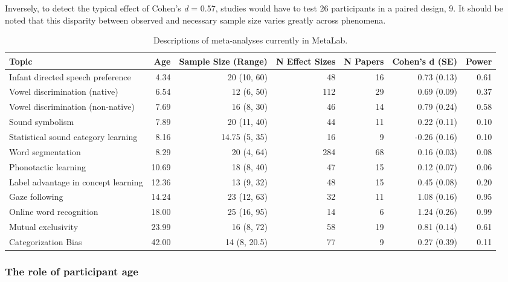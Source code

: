 \documentclass[english,floatsintext,man]{apa6}
\begin{document}
Inversely, to detect the typical effect of Cohen's \emph{d} = 0.57,
studies would have to test 26 participants in a paired design, 9. It
should be noted that this disparity between observed and necessary
sample size varies greatly across phenomena.

\begin{table}[tbp]
\begin{center}
\begin{threeparttable}
\caption{Descriptions of meta-analyses currently in MetaLab.}
\begin{tabular}{lrrrrrr}
\toprule
Topic & Age & Sample Size (Range) & N Effect Sizes & N Papers & Cohen's d (SE) & Power\\
\midrule
Infant directed speech preference & 4.34 & 20 (10, 60) & 48 & 16 & 0.73 (0.13) & 0.61\\
Vowel discrimination (native) & 6.54 & 12 (6, 50) & 112 & 29 & 0.69 (0.09) & 0.37\\
Vowel discrimination (non-native) & 7.69 & 16 (8, 30) & 46 & 14 & 0.79 (0.24) & 0.58\\
Sound symbolism & 7.89 & 20 (11, 40) & 44 & 11 & 0.22 (0.11) & 0.10\\
Statistical sound category learning & 8.16 & 14.75 (5, 35) & 16 & 9 & -0.26 (0.16) & 0.10\\
Word segmentation & 8.29 & 20 (4, 64) & 284 & 68 & 0.16 (0.03) & 0.08\\
Phonotactic learning & 10.69 & 18 (8, 40) & 47 & 15 & 0.12 (0.07) & 0.06\\
Label advantage in concept learning & 12.36 & 13 (9, 32) & 48 & 15 & 0.45 (0.08) & 0.20\\
Gaze following & 14.24 & 23 (12, 63) & 32 & 11 & 1.08 (0.16) & 0.95\\
Online word recognition & 18.00 & 25 (16, 95) & 14 & 6 & 1.24 (0.26) & 0.99\\
Mutual exclusivity & 23.99 & 16 (8, 72) & 58 & 19 & 0.81 (0.14) & 0.61\\
Categorization Bias & 42.00 & 14 (8, 20.5) & 77 & 9 & 0.27 (0.39) & 0.11\\
\bottomrule
\end{tabular}
\end{threeparttable}
\end{center}
\end{table}

\subsubsection{The role of participant
age}\label{the-role-of-participant-age}
\end{document}
